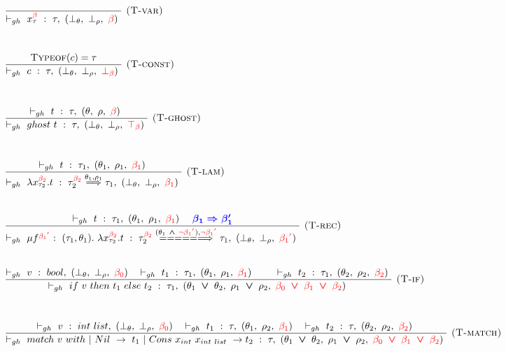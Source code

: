 \documentclass[a4paper,11pt,oneside]{article}
\theoremstyle{plain}
\newcommand{\rouge}[1]{\textcolor{red}{#1}}
\newcommand{\bwedge}{\boldsymbol{~\wedge~}}
\newcommand{\bvee}{\boldsymbol{~\vee~}}
\newcommand{\ghosttyping}[6]{\vdash_{gh}~#1~:~#2,~(#3,~#4,~\rouge{#5})~\textcolor{blue}{\boldsymbol{#6}}}
\newcommand{\bth}{\bot_\theta}
\newcommand{\brh}{\bot_\rho}
\newcommand{\gb}{\beta}
\newcommand{\gba}[1]{\beta_{#1}}
\newcommand{\gbb}{\bot_\beta}
\newcommand{\gbt}{\top_\beta}
\newcommand{\gbr}{\textcolor{red}{\gb}}
\newcommand{\gbra}[1]{\textcolor{red}{\gba{#1}}}
\newcommand{\gbbr}{\textcolor{red}{\gbb}}
\newcommand{\gbtr}{\textcolor{red}{\gbt}}
\newcommand{\gbran}[1]{\textcolor{red}{\neg\gba{#1}}}
\begin{document}
\begin{figure}[H]
\begin{adjustwidth}{-5em}{5em}
\begin{small}
\begin{minipage}[t]{0.45\linewidth}
\begin{displaymath}
\begin{array}{l}

\dfrac
	{}
	{\ghosttyping{x^{\gbr}_{\tau}}{\tau}{\bot_{\theta}}{\bot_{\rho}}{\gbr}{}}
	{\textsc{  (T-var)}} \\[1.3cm]	

\dfrac
	{\textsc{Typeof}(c) = \tau}
	{\ghosttyping{c}{\tau}{\bot_{\theta}}{\bot_{\rho}}{\gbbr}{}}
	{\textsc{  (T-const)}} \\[1.3cm]	


\dfrac
	{\ghosttyping
		{t}
		{\tau}
		{\theta}
		{\rho}
		{\gbr}
		{}}
	{\ghosttyping
		{ghost~t}
		{\tau}
		{\bth}
		{\brh}
		{\gbtr}
		{}} 
{\textsc{  (T-ghost)}}	\\[1.3cm]		
	
\dfrac
	{\ghosttyping
		{t}
		{\tau_1}
		{\theta_1}
		{\rho_1}
		{\gbra{1}}
		{}}
	{\ghosttyping
		{\lambda x^{\gbra{2}}_{\tau_2} . t}
		{\tau_{2}^{\gbra{2}} \stackrel{\theta_1, \rho_1}{\Longrightarrow} \tau_1}
		{\bth}
		{\brh}
		{\gbra{1}}
		{}}
	{\textsc{  (T-lam)}}\\[1.3cm]			
	
\dfrac
	{\ghosttyping
		{t}
		{\tau_1}
		{\theta_1}
		{\rho_1}
		{\gbra{1}}
		{\quad \gba{1} \Rightarrow \beta_1'}}
	{\ghosttyping
		{\mu f^{\gbra{1}^{\rouge{'}}}:~(\tau_1, \theta_1).~\lambda x^{\gbra{2}}_{\tau_2}. t} 
		{\tau_{2}^{\gbra{2}} \stackrel{(\theta_1 \bwedge \gbran{1}^{\rouge{'}}), \gbran{1}^{\rouge{'}}}{=======>} \tau_1}
		{\bth}
		{\brh}
		{\gbra{1}^{\rouge{'}}}
		{}}
	{\textsc{  (T-rec)}}\\[1.3cm]			
	
	\dfrac
	{
		\ghosttyping{v}{bool}{\bth}{\brh}{\gbra{0}}{} ~~
		\ghosttyping{t_1}{\tau_1}{\theta_1}{\rho_1}{\gbra{1}}{} \qquad
		\ghosttyping{t_2}{\tau_1}{\theta_2}{\rho_2}{\gbra{2}}{}
	}
	{	\ghosttyping{if~v~then~t_1~else~t_2}
		{\tau_1}{\theta_1 \bvee \theta_2}{\rho_1 \bvee \rho_2}
		{\gbra{0} \bvee \gbra{1} \bvee \gbra{2}}{}}
	{\textsc{  (T-if)}}	\\[1.3cm]	
		
\dfrac
	{\ghosttyping{v}{int~list}{\bth}{\brh}{\gbra{0}}{} ~~
	 \ghosttyping{t_1}{\tau}{\theta_1}{\rho_2}{\gbra{1}}{}  ~~
	 \ghosttyping{t_2}{\tau}{\theta_2}{\rho_2}{\gbra{2}}{}  }
	{\ghosttyping{match~v~with ~|~Nil~->~t_1~|~Cons~x_{int}~x_{int~list}~->t_2}{\tau}{\theta_1 \bvee \theta_2}
		{\rho_1 \bvee \rho_2}
		{\gbra{0} \bvee \gbra{1} \bvee \gbra{2}}{}} 
{\textsc{  (T-match)}}
	

\end{array}
\end{displaymath}
\end{minipage}
\end{small}
\end{adjustwidth}
\end{figure}
\end{document}
